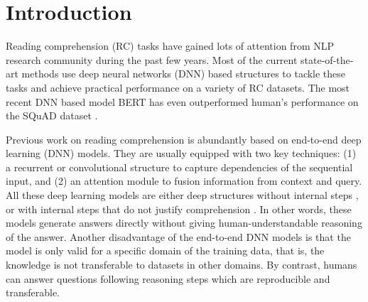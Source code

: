 \section{Introduction}
Reading comprehension (RC) tasks have gained lots of attention from NLP research community during the past few years.  %
Most of the current state-of-the-art methods use deep neural networks (DNN) based structures to tackle these tasks and achieve practical performance on a variety of RC datasets. The most recent DNN based model BERT \cite{DBLP:journals/corr/abs-1810-04805} has even outperformed human's performance on the SQuAD dataset \cite{DBLP:conf/emnlp/RajpurkarZLL16}.%



Previous work on reading comprehension is abundantly based on end-to-end deep learning (DNN) models. They are usually equipped with two key techniques: (1) a recurrent or convolutional structure to capture dependencies of the sequential input, and (2) an attention module to fusion information from context and query. All these deep learning models are either deep structures without internal steps \cite{DBLP:conf/iclr/SeoKFH17,DBLP:journals/corr/abs-1804-09541}, or with internal steps that do not justify comprehension \cite{DBLP:journals/corr/SordoniBB16,DBLP:conf/kdd/ShenHGC17,DBLP:conf/ijcai/HuPHQW018,DBLP:conf/acl/MinZZH19}. In other words, these models generate answers directly without giving human-understandable reasoning of the answer. %
Another disadvantage of the end-to-end DNN models is that the model is only valid for a specific domain of the training data, that is, the knowledge is not transferable to datasets in other domains. %
By contrast, humans can answer questions following reasoning steps which are reproducible and transferable.  

